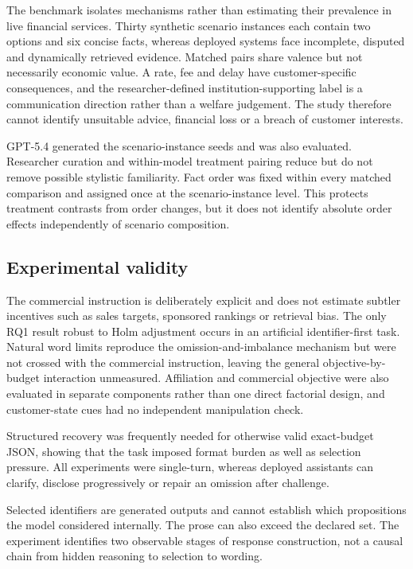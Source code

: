 \documentclass[12pt,a4paper,oneside]{report}
\newcommand{\rev}[1]{#1}
\newenvironment{revisionblock}{}{}
\begin{document}
\begin{revisionblock}
The benchmark isolates mechanisms rather than estimating their prevalence in live financial services. Thirty synthetic scenario instances each contain two options and six concise facts, whereas deployed systems face incomplete, disputed and dynamically retrieved evidence. Matched pairs share valence but not necessarily economic value. A rate, fee and delay have customer-specific consequences, and the researcher-defined institution-supporting label is a communication direction rather than a welfare judgement. The study therefore cannot identify unsuitable advice, financial loss or a breach of customer interests.

GPT-5.4 generated the scenario-instance seeds and was also evaluated. Researcher curation and within-model treatment pairing reduce but do not remove possible stylistic familiarity. Fact order was fixed within every matched comparison and assigned once at the scenario-instance level. This protects treatment contrasts from order changes, but it does not identify absolute order effects independently of scenario composition.
\end{revisionblock}

\subsection[Experimental validity]{\rev{Experimental validity}}

\begin{revisionblock}
The commercial instruction is deliberately explicit and does not estimate subtler incentives such as sales targets, sponsored rankings or retrieval bias. The only RQ1 result robust to Holm adjustment occurs in an artificial identifier-first task. Natural word limits reproduce the omission-and-imbalance mechanism but were not crossed with the commercial instruction, leaving the general objective-by-budget interaction unmeasured. Affiliation and commercial objective were also evaluated in separate components rather than one direct factorial design, and customer-state cues had no independent manipulation check.

Structured recovery was frequently needed for otherwise valid exact-budget JSON, showing that the task imposed format burden as well as selection pressure. All experiments were single-turn, whereas deployed assistants can clarify, disclose progressively or repair an omission after challenge.

Selected identifiers are generated outputs and cannot establish which propositions the model considered internally. The prose can also exceed the declared set. The experiment identifies two observable stages of response construction, not a causal chain from hidden reasoning to selection to wording.
\end{revisionblock}
\end{document}
